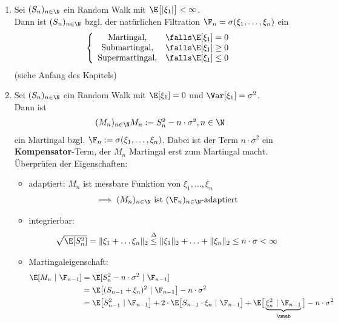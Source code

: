 \begin{beisp}\
\begin{enumerate}[label=(\alph*)]
\item Sei $(S_n)_{n\in\N}$ ein Random Walk mit $\E\big[|\xi_1|\big]<\infty$.\\
Dann ist $(S_n)_{n\in\N}$ bzgl. der natürlichen Filtration $\F_n=\sigma(\xi_1,\ldots,\xi_n)$ ein
\begin{align*}
\left\lbrace\begin{array}{cl}
\text{Martingal}, & \falls \E[\xi_1]=0\\
\text{Submartingal}, & \falls \E[\xi_1]\geq0\\
\text{Supermartingal}, & \falls \E[\xi_1]\leq0\\
\end{array}\right.
\end{align*}
(siehe Anfang des Kapitels)
\item Sei $(S_n)_{n\in\N}$ ein Random Walk mit $\E[\xi_1]=0$ und $\Var[\xi_1]=\sigma^2$.\\
Dann ist 
\begin{align*}
(M_n)_{n\in\N}\mit M_n:=S_n^2-n\cdot\sigma^2,n\in\N
\end{align*}
ein Martingal bzgl. $\F_n:=\sigma(\xi_1,\ldots,\xi_n)$. Dabei ist der Term $n\cdot\sigma^2$ ein \textbf{Kompensator}-Term, der $M_n$ Martingal erst zum Martingal macht. Überprüfen der Eigenschaften:
\begin{itemize}
\item adaptiert: $M_n$ ist messbare Funktion von $\xi_1,\ldots,\xi_n$
\begin{align*}
	\implies(M_n)_{n\in\N} \text{ ist } (\F_n)_{n\in\N}\text{-adaptiert}
\end{align*}
\item integrierbar: \begin{align*}
\sqrt{\E[S_n^2]}=\Vert\xi_1+\ldots\xi_n\Vert_2\stackrel{\Delta}{\leq}\Vert\xi_1\Vert_2+\ldots+\Vert\xi_n\Vert_2\leq n\cdot\sigma<\infty
\end{align*}
\item Martingaleigenschaft:
\begin{align*}
\E[M_n~|~\F_{n-1}]
&=\E[S_n^2-n\cdot\sigma^2~|~\F_{n-1}]\\
&=\E\big[(S_{n-1}+\xi_n)^2~|~\F_{n-1}\big]-n\cdot\sigma^2\\
&=\E\big[S_{n-1}^2~|~\F_{n-1}\big]+2\cdot\E\big[S_{n-1}\cdot\xi_n~|~\F_{n-1}\big]+\E\big[\underbrace{\xi_n^2~|~\F_{n-1}}_{\unab}\big]-n\cdot\sigma^2\\

\end{align*}
\end{itemize}
\end{enumerate}
\end{beisp}
